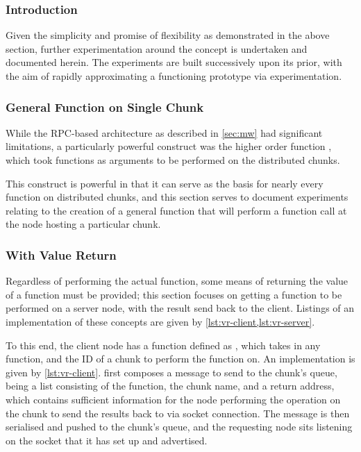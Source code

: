 \subsubsection{Introduction}

Given the simplicity and promise of flexibility as demonstrated in the above section, further experimentation around the concept is undertaken and documented herein.
The experiments are built successively upon its prior, with the aim of rapidly approximating a functioning prototype via experimentation.

\subsubsection{General Function on Single Chunk}

While the RPC-based architecture as described in \cref{sec:mw} had significant limitations, a particularly powerful construct was the higher order function , which took functions as arguments to be performed on the distributed chunks.

This construct is powerful in that it can serve as the basis for nearly every function on distributed chunks, and this section serves to document experiments relating to the creation of a general function that will perform a function call at the node hosting a particular chunk.

\subsubsection{With Value Return}\label{sec:val-ret}

Regardless of performing the actual function, some means of returning the value of a function must be provided; this section focuses on getting a function to be performed on a server node, with the result send back to the client.
Listings of an implementation of these concepts are given by \cref{lst:vr-client,lst:vr-server}.



To this end, the client node has a function defined as , which takes in any function, and the ID of a chunk to perform the function on.
An implementation is given by \cref{lst:vr-client}.
 first composes a message to send to the chunk's queue, being a
list consisting of the function, the chunk name, and a return address, which
contains sufficient information for the node performing the operation on the
chunk to send the results back to via socket connection.
The message is then serialised and pushed to the chunk's queue, and the requesting node sits listening on the socket that it has set up and advertised.


